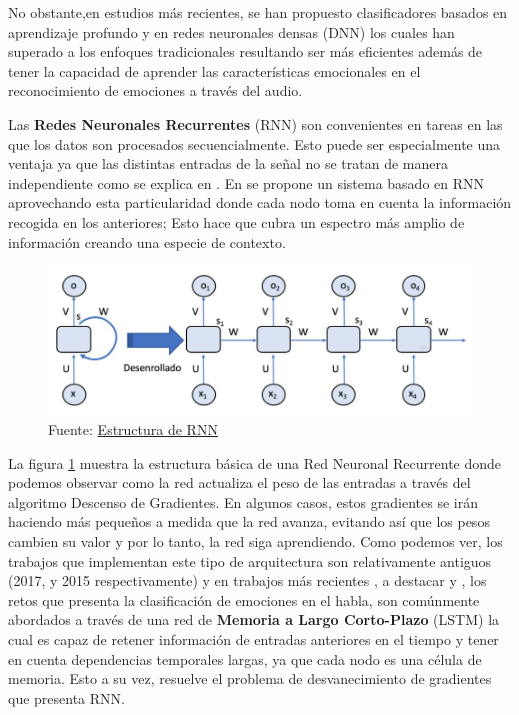 \documentclass[11pt,a4paper,spanish]{book}
\begin{document}
	
	No obstante,en estudios más recientes, se han propuesto clasificadores basados en aprendizaje profundo y en redes neuronales densas (DNN) los cuales han superado a los enfoques tradicionales resultando ser más eficientes además de tener la capacidad de aprender las características emocionales en el reconocimiento de emociones a través del audio.
	
	Las \textbf{Redes Neuronales Recurrentes} (RNN) son convenientes en tareas en las que los datos son procesados secuencialmente. Esto puede ser especialmente una ventaja ya que las distintas entradas de la señal no se tratan de manera independiente como se explica en \cite{Lim2017}. En \cite{Lee2015} se propone un sistema basado en RNN aprovechando esta particularidad donde cada nodo toma en cuenta la información recogida en los anteriores; Esto hace que cubra un espectro más amplio de información creando una especie de contexto.
	
	\begin{figure}[H]
		\centering
		\includegraphics[scale=0.25]{rnn_structure.JPG} 
		\caption{Fuente:  \href{http://personal.cimat.mx:8181/~mrivera/cursos/aprendizaje_profundo/RNN_LTSM/introduccion_rnn.html}{Estructura de RNN}}
		\label{fig:rnn_structure}
	\end{figure}
	
	La figura \ref{fig:rnn_structure} muestra la estructura básica de una Red Neuronal Recurrente donde podemos observar como la red actualiza el peso de las entradas a través del algoritmo Descenso de Gradientes. En algunos casos, estos gradientes se irán haciendo más pequeños a medida que la red avanza, evitando así que los pesos cambien su valor y por lo tanto, la red siga aprendiendo. Como podemos ver, los trabajos que implementan este tipo de arquitectura son relativamente antiguos (2017, y 2015 respectivamente) y en trabajos más recientes , a destacar \cite{Wang2020} y \cite{Atmaja2019}, los retos que presenta la clasificación de emociones en el habla, son comúnmente abordados a través de una red de \textbf{Memoria a Largo Corto-Plazo} (LSTM) la cual es capaz de retener información de entradas anteriores en el tiempo y tener en cuenta dependencias temporales largas, ya que cada nodo es una célula de memoria. Esto a su vez, resuelve el problema de desvanecimiento de gradientes que presenta RNN.
	
\end{document}
